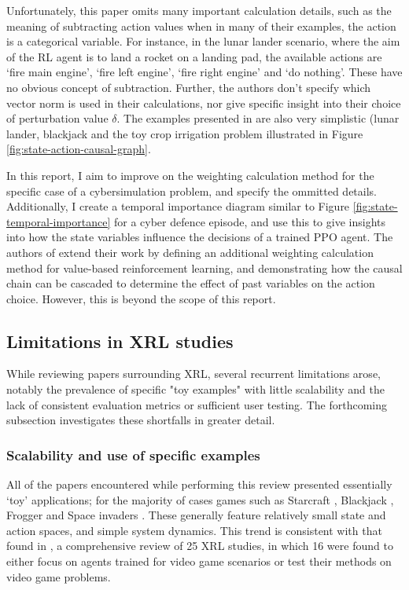 \documentclass{article}
\begin{document}
Unfortunately, this paper omits many important calculation details, such as the meaning of subtracting action values when in many of their examples, the action is a categorical variable. For instance, in the lunar lander scenario, where the aim of the RL agent is to land a rocket on a landing pad, the available actions are `fire main engine', `fire left engine', `fire right engine' and `do nothing'. These have no obvious concept of subtraction. Further, the authors don't specify which vector norm is used in their calculations, nor give specific insight into their choice of perturbation value $\delta$. The examples presented in \cite{wang2022causal} are also very simplistic (lunar lander, blackjack and the toy crop irrigation problem illustrated in Figure \ref{fig:state-action-causal-graph}. 

In this report, I aim to improve on the weighting calculation method for the specific case of a cybersimulation problem, and specify the ommitted details. Additionally, I  create a temporal importance diagram similar to Figure \ref{fig:state-temporal-importance} for a cyber defence episode, and use this to give insights into how the state variables influence the decisions of a trained PPO agent. The authors of \cite{wang2022causal} extend their work by defining an additional weighting calculation method for value-based reinforcement learning, and demonstrating how the causal chain can be cascaded to determine the effect of past variables on the action choice. However, this is beyond the scope of this report. 

\subsection{Limitations in XRL studies}

While reviewing papers surrounding XRL, several recurrent limitations arose, notably the prevalence of specific "toy examples" with little scalability and the lack of consistent evaluation metrics or sufficient user testing. The forthcoming subsection investigates these shortfalls in greater detail. 

\subsubsection{Scalability and use of specific examples}

All of the papers encountered while performing this review presented essentially `toy' applications; for the majority of cases games such as Starcraft \cite{madumal2020explainable}, Blackjack \cite{wang2022causal}, Frogger \cite{ehsan2019automated} and Space invaders \cite{greydanus2018visualizing}. These generally feature relatively small state and action spaces, and simple system dynamics. This trend is consistent with that found in \cite{wells2021explainable}, a comprehensive review of 25 XRL studies, in which 16 were found to either focus on agents trained for video game scenarios or test their methods on video game problems. 
\end{document}
